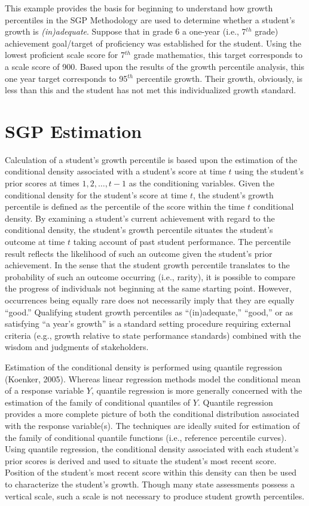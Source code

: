 \documentclass[12pt]{article}
\begin{document}
This example provides the basis for beginning to understand how growth
percentiles in the SGP Methodology are used to determine whether a
student's growth is \emph{(in)adequate}. Suppose that in grade 6 a
one-year (i.e., 7\(^{th}\) grade) achievement goal/target of proficiency
was established for the student. Using the lowest proficient scale score
for 7\(^{th}\) grade mathematics, this target corresponds to a scale
score of 900. Based upon the results of the growth percentile analysis,
this one year target corresponds to 95\(^{th}\) percentile growth. Their
growth, obviously, is less than this and the student has not met this
individualized growth standard.

\pagebreak

\section{SGP Estimation}\label{sgp-estimation}

Calculation of a student's growth percentile is based upon the
estimation of the conditional density associated with a student's score
at time \(t\) using the student's prior scores at times
\(1, 2, \ldots, t-1\) as the conditioning variables. Given the
conditional density for the student's score at time \(t\), the student's
growth percentile is defined as the percentile of the score within the
time \(t\) conditional density. By examining a student's current
achievement with regard to the conditional density, the student's growth
percentile situates the student's outcome at time \(t\) taking account
of past student performance. The percentile result reflects the
likelihood of such an outcome given the student's prior achievement. In
the sense that the student growth percentile translates to the
probability of such an outcome occurring (i.e., rarity), it is possible
to compare the progress of individuals not beginning at the same
starting point. However, occurrences being equally rare does not
necessarily imply that they are equally ``good.'' Qualifying student
growth percentiles as ``(in)adequate,'' ``good,'' or as satisfying ``a
year's growth'' is a standard setting procedure requiring external
criteria (e.g., growth relative to state performance standards) combined
with the wisdom and judgments of stakeholders.

Estimation of the conditional density is performed using quantile
regression (Koenker, 2005). Whereas linear regression methods model the
conditional mean of a response variable \(Y\), quantile regression is
more generally concerned with the estimation of the family of
conditional quantiles of \(Y\). Quantile regression provides a more
complete picture of both the conditional distribution associated with
the response variable(s). The techniques are ideally suited for
estimation of the family of conditional quantile functions (i.e.,
reference percentile curves). Using quantile regression, the conditional
density associated with each student's prior scores is derived and used
to situate the student's most recent score. Position of the student's
most recent score within this density can then be used to characterize
the student's growth. Though many state assessments possess a vertical
scale, such a scale is not necessary to produce student growth
percentiles.
\end{document}
